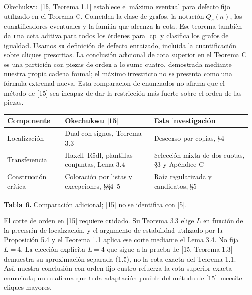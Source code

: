 \documentclass[spanish,11pt,a4paper]{article}
\newcounter{none}
\begin{document}
Okechukwu {[}15, Teorema 1.1{]} establece el máximo eventual para defecto fijo utilizado en el Teorema C. Coinciden la clase de grafos, la notación \(Q_s(n)\), los cuantificadores eventuales y la familia que alcanza la cota. Ese teorema también da una cota aditiva para todos los órdenes para \(\operatorname{cp}\) y clasifica los grafos de igualdad. Usamos su definición de defecto enraizado, incluida la cuantificación sobre cliques prescritas. La conclusión adicional de cota superior en el Teorema C es una partición con piezas de orden a lo sumo cuatro, demostrada mediante nuestra propia cadena formal; el máximo irrestricto no se presenta como una fórmula extremal nueva. Esta comparación de enunciados no afirma que el método de {[}15{]} sea incapaz de dar la restricción más fuerte sobre el orden de las piezas.


{\def\LTcaptype{none} %
\begin{longtable}[c]{@{}
  >{\raggedright\arraybackslash}p{}
  >{\raggedright\arraybackslash}p{}
  >{\raggedright\arraybackslash}p{}@{}}
\toprule\noalign{}
\begin{minipage}[b]{\linewidth}\raggedright
Componente
\end{minipage} & \begin{minipage}[b]{\linewidth}\raggedright
Okechukwu {[}15{]}
\end{minipage} & \begin{minipage}[b]{\linewidth}\raggedright
Esta investigación
\end{minipage} \\
\midrule\noalign{}
\endhead
\bottomrule\noalign{}
\endlastfoot
Localización & Dual con signos, Teorema 3.3 & Descenso por copias, §4 \\
Transferencia & Haxell--Rödl, plantillas conjuntas, Lema 3.4 & Selección mixta de dos cuotas, §3 y Apéndice C \\
Construcción crítica & Coloración por listas y excepciones, §§4--5 & Raíz regularizada y candidatos, §5 \\
\end{longtable}
}

\textbf{Tabla 6.} Comparación adicional; {[}15{]} no se identifica con {[}5{]}.

El corte de orden en {[}15{]} requiere cuidado. Su Teorema 3.3 elige \(L\) en función de la precisión de localización, y el argumento de estabilidad utilizado por la Proposición 5.4 y el Teorema 1.1 aplica ese corte mediante el Lema 3.4. No fija \(L=4\). La elección explícita \(L=4\) que sigue a la prueba de {[}15, Teorema 1.3{]} demuestra su aproximación separada (1.5), no la cota exacta del Teorema 1.1. Así, nuestra conclusión con orden fijo cuatro refuerza la cota superior exacta enunciada; no se afirma que toda adaptación posible del método de {[}15{]} necesite cliques mayores.
\end{document}
